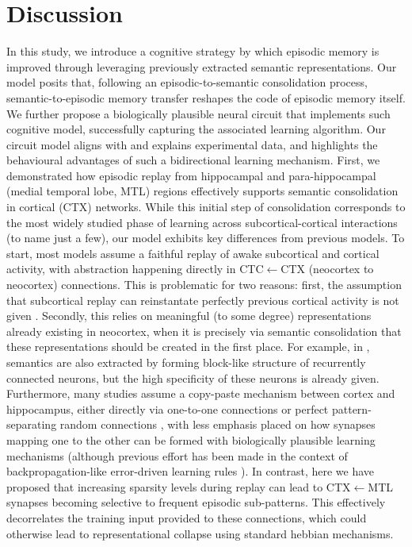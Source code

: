 \documentclass{article}
\begin{document}
\section*{Discussion}
In this study, we introduce a cognitive strategy by which episodic memory is improved through leveraging previously extracted semantic representations. Our model posits that, following an episodic-to-semantic consolidation process, semantic-to-episodic memory transfer reshapes the code of episodic memory itself. We further propose a biologically plausible neural circuit that implements such cognitive model, successfully capturing the associated learning algorithm. Our circuit model aligns with and explains experimental data, and highlights the behavioural advantages of such a bidirectional learning mechanism.
\newline\newline
First, we demonstrated how episodic replay from hippocampal and para-hippocampal (medial temporal lobe, MTL) regions effectively supports semantic consolidation in cortical (CTX) networks. While this initial step of consolidation corresponds to the most widely studied phase of learning across subcortical-cortical interactions  (to name just a few), our model exhibits key differences from previous models. To start, most models assume a faithful replay of awake subcortical and cortical activity, with abstraction happening directly in CTC$\leftarrow$CTX (neocortex to neocortex) connections. This is problematic for two reasons: first, the assumption that subcortical replay can reinstantate perfectly previous cortical activity is not given . Secondly, this relies on meaningful (to some degree) representations already existing in neocortex, when it is precisely via semantic consolidation that these representations should be created in the first place. For example, in , semantics are also extracted by forming block-like structure of recurrently connected neurons, but the high specificity of these neurons is already given. Furthermore, many studies assume a copy-paste mechanism between cortex and hippocampus, either directly via one-to-one connections  or perfect pattern-separating random connections , with less emphasis placed on how synapses mapping one to the other can be formed with biologically plausible learning mechanisms (although previous effort has been made in the context of backpropagation-like error-driven learning rules ). In contrast, here we have proposed that increasing sparsity levels during replay can lead to CTX$\leftarrow$MTL synapses becoming selective to frequent episodic sub-patterns. This effectively decorrelates the training input provided to these connections, which could otherwise lead to representational collapse using standard hebbian mechanisms. 
\end{document}
